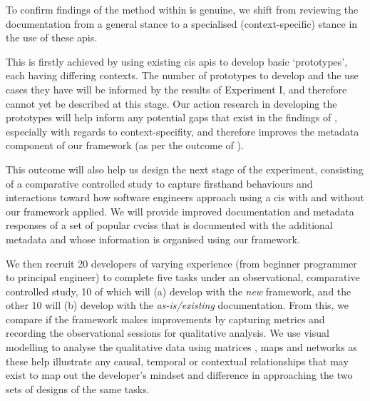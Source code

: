 To confirm findings of the method within  is genuine, we shift from reviewing the documentation from a general stance to a specialised (context-specific) stance in the use of these \glspl{api}.

This is firstly achieved by using existing \gls{cis} \glspl{api} to develop basic `prototypes', each having differing contexts. The number of prototypes to develop and the use cases they have will be informed by the results of Experiment I, and therefore cannot yet be described at this stage. Our action research in developing the prototypes will help inform any potential gaps that exist in the findings of , especially with regards to context-specifity, and therefore improves the metadata component of our framework (as per the outcome of ). 

This outcome will also help us design the next stage of the experiment, consisting of a comparative controlled study \citep{Seaman:2007wa} to capture firsthand behaviours and interactions toward how software engineers approach using a \gls{cis} with and without our framework applied. We will provide improved documentation and metadata responses of a set of popular \glspl{cvcis} that is documented with the additional metadata and whose information is organised using our framework. 

We then recruit 20 developers of varying experience (from beginner programmer to principal engineer) to complete five tasks under an observational, comparative controlled study, 10 of which will (a) develop with the \textit{new} framework, and the other 10 will (b) develop with the \textit{as-is/existing} documentation. From this, we compare if the framework makes improvements by capturing metrics and recording the observational sessions for qualitative analysis. We use visual modelling to analyse the qualitative data using matrices \citep{Dey:2003ty}, maps and networks \citep{Miles:1994ty} as these help illustrate any causal, temporal or contextual relationships that may exist to map out the developer's mindset and difference in approaching the two sets of designs of the same tasks.


